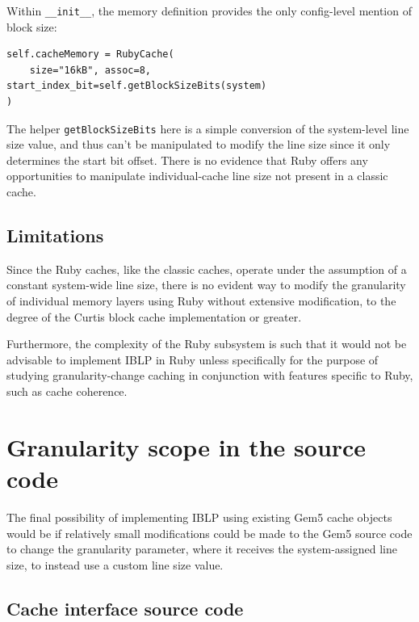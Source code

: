 \documentclass[12pt,twoside]{reedthesis}
\begin{document}
	Within \verb`__init__`, the memory definition provides the only config-level mention of block size: \begin{verbatim}
self.cacheMemory = RubyCache(
    size="16kB", assoc=8, start_index_bit=self.getBlockSizeBits(system)
)\end{verbatim}

	The helper \verb`getBlockSizeBits` here is a simple conversion of the system-level line size value, and thus can't be manipulated to modify the line size since it only determines the start bit offset. There is no evidence that Ruby offers any opportunities to manipulate individual-cache line size not present in a classic cache.

	\subsection*{Limitations}

	Since the Ruby caches, like the classic caches, operate under the assumption of a constant system-wide line size, there is no evident way to modify the granularity of individual memory layers using Ruby without extensive modification, to the degree of the Curtis block cache implementation or greater.

	Furthermore, the complexity of the Ruby subsystem is such that it would not be advisable to implement IBLP in Ruby unless specifically for the purpose of studying granularity-change caching in conjunction with features specific to Ruby, such as cache coherence.

\section{Granularity scope in the source code}

	The final possibility of implementing IBLP using existing Gem5 cache objects would be if relatively small modifications could be made to the Gem5 source code to change the granularity parameter, where it receives the system-assigned line size, to instead use a custom line size value.

	\subsection*{Cache interface source code}
\end{document}
